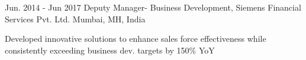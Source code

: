 \begin{cventries}
  
  \cventry
    {Jun. 2014 - Jun 2017} %
    {Deputy Manager- Business Development, Siemens Financial Services Pvt. Ltd.} %
    {Mumbai, MH, India} %
    {} %
    {
      \begin{cvitems} %
        \item {Developed innovative solutions to enhance sales force effectiveness while consistently exceeding business dev. targets by 150\% YoY}
      \end{cvitems}
    }

\end{cventries}
\vspace{-4.5mm}